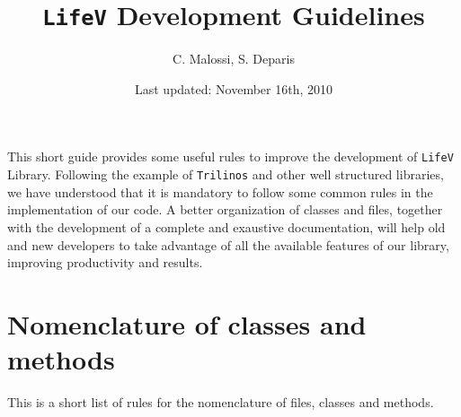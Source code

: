 \documentclass[10p]{article}
\title{\texttt{LifeV} Development Guidelines}
\author{C. Malossi, S. Deparis}
\date{Last updated: November 16th, 2010}
\begin{document}
\maketitle

This short guide provides some useful rules to improve the development of \texttt{LifeV} Library. Following the example of \texttt{Trilinos} and other well structured libraries, we have understood that it is mandatory to follow some common rules in the implementation of our code. A better organization of classes and files, together with the development of a complete and exaustive documentation, will help old and new developers to take advantage of all the available features of our library, improving productivity and results.

\section{Nomenclature of classes and methods}
This is a short list of rules for the nomenclature of files, classes and methods.
\end{document}
